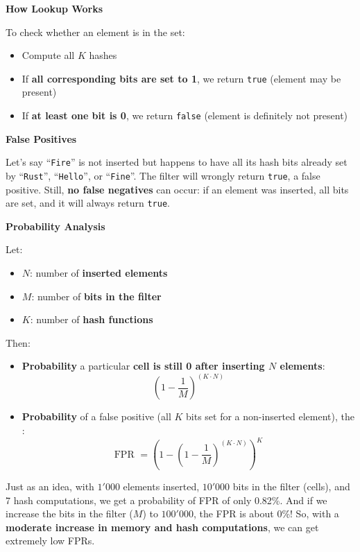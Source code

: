 \highspace
\begin{flushleft}
    \textcolor{Green3}{ \textbf{How Lookup Works}}
\end{flushleft}
To check whether an element is in the set:
\begin{itemize}
    \item Compute all $K$ hashes
    \item If \textbf{all corresponding bits are set to 1}, we return \texttt{true} (element may be present)
    \item If \textbf{at least one bit is 0}, we return \texttt{false} (element is definitely not present)
\end{itemize}

\newpage

\begin{flushleft}
    \textcolor{Red2}{ \textbf{False Positives}}
\end{flushleft}
Let's say ``\texttt{Fire}'' is not inserted but happens to have all its hash bits already set by ``\texttt{Rust}'', ``\texttt{Hello}'', or ``\texttt{Fine}''. The filter will wrongly return \texttt{true}, a false positive. Still, \textbf{no false negatives} can occur: if an element was inserted, all bits are set, and it will always return \texttt{true}.

\highspace
\begin{flushleft}
    \textcolor{Green3}{ \textbf{Probability Analysis}}
\end{flushleft}
Let:
\begin{itemize}
    \item $N$: number of \textbf{inserted elements}
    \item $M$: number of \textbf{bits in the filter}
    \item $K$: number of \textbf{hash functions}
\end{itemize}
Then:
\begin{itemize}
    \item \textbf{Probability} a particular \textbf{cell is still 0 after inserting $N$ elements}:
    \begin{equation}
        \left(1 - \dfrac{1}{M}\right)^{\left(K \cdot N\right)}
    \end{equation}

    \item \textbf{Probability} of a false positive (all $K$ bits set for a non-inserted element), the :
    \begin{equation}
        \text{FPR } = \left(1 - \left(1 - \dfrac{1}{M}\right)^{\left(K \cdot N\right)}\right)^{K}
    \end{equation}
\end{itemize}
Just as an idea, with $1'000$ elements inserted, $10'000$ bits in the filter (cells), and 7 hash computations, we get a probability of FPR of only 0.82\%. And if we increase the bits in the filter ($M$) to $100'000$, the FPR is about 0\%! So, with a \textbf{moderate increase in memory and hash computations}, we can get extremely low FPRs.

